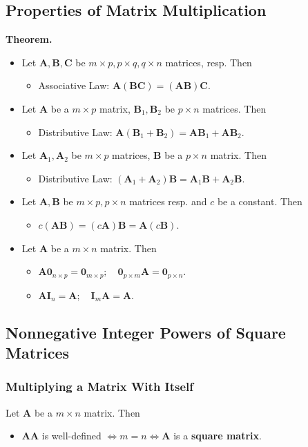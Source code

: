 \documentclass[../ma2001_notes.tex]{subfiles}
\begin{document}
\subsection{Properties of Matrix Multiplication}
\textbf{Theorem.}
\begin{itemize}
	\item Let \(\bm{A},\bm{B},\bm{C}\) be \(m\times p,p\times q,q\times n\) matrices, resp. Then
	\begin{itemize}
		\item Associative Law: \(\bm{A}(\bm{B}\bm{C})=(\bm{A}\bm{B})\bm{C}\).
	\end{itemize}
	\item Let \(\bm{A}\) be a \(m\times p\) matrix, \(\bm{B}_1, \bm{B}_2\) be \(p\times n\) matrices. Then
	\begin{itemize}
		\item Distributive Law: \(\bm{A}(\bm{B}_1+\bm{B}_2)=\bm{A}\bm{B}_1+\bm{A}\bm{B}_2\).
	\end{itemize}
	\item Let \(\bm{A}_1,\bm{A}_2\) be \(m\times p\) matrices, \(\bm{B}\) be a \(p\times n\) matrix. Then
	\begin{itemize}
		\item Distributive Law: \((\bm{A}_1+\bm{A}_2)\bm{B}=\bm{A}_1\bm{B}+\bm{A}_2\bm{B}\).
	\end{itemize}
	\item Let \(\bm{A}, \bm{B}\) be \(m\times p, p\times n\) matrices resp. and \(c\) be a constant. Then
	\begin{itemize}
		\item\(c(\bm{A}\bm{B})=(c\bm{A})\bm{B}=\bm{A}(c\bm{B})\).
	\end{itemize}
	\item Let \(\bm{A}\) be a \(m\times n\) matrix. Then
	\begin{itemize}
		\item\(\bm{A}\bm{0}_{n\times p}=\bm{0}_{m\times p};\quad\bm{0}_{p\times m}\bm{A}=\bm{0}_{p\times n}\).
		\item\(\bm{A}\bm{I}_n=\bm{A};\quad\bm{I}_m\bm{A}=\bm{A}\).
	\end{itemize}
\end{itemize}

\subsection{Nonnegative Integer Powers of Square Matrices}
\subsubsection{Multiplying a Matrix With Itself}
Let \(\bm{A}\) be a \(m\times n\) matrix. Then
\begin{itemize}
	\item\(\bm{A}\bm{A}\) is well-defined \(\iff m=n\iff\bm{A}\) is a \textbf{square matrix}.
\end{itemize}
\end{document}
